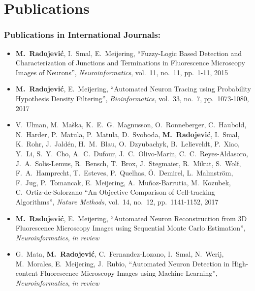 %
%

\noquote
\orgchpos
\chapter*{Publications}
\label{publications}

\small
\normalsize

\subsection*{Publications in International Journals:}
\vspace{1ex}
\begin{itemize}
	\item \textbf{M.~Radojevi\'{c}}, I.~Smal, E.~Meijering, ``Fuzzy-Logic Based Detection and Characterization of Junctions and Terminations in Fluorescence Microscopy Images of Neurons'', \emph{Neuroinformatics}, vol.~11, no.~11, pp.~1-11, 2015
	
	\item \textbf{M.~Radojevi\'{c}}, E.~Meijering, ``Automated Neuron Tracing using Probability Hypothesis Density Filtering'', \emph{Bioinformatics}, vol.~33, no.~7, pp.~1073-1080, 2017
	
	\item V.~Ulman, M.~Ma\v{s}ka, K.~E.~G.~Magnusson, O.~Ronneberger, C.~Haubold, N.~Harder, P.~Matula, P.~Matula, D.~Svoboda, \textbf{M.~Radojevi\'{c}}, I.~Smal, K.~Rohr, J.~Jald\'{e}n, H.~M.~Blau, O.~Dzyubachyk, B.~Lelieveldt, P.~Xiao, Y.~Li, S.~Y.~Cho, A.~C.~Dufour,	J.~C.~Olivo-Marin, C.~C.~Reyes-Aldasoro, J.~A.~Solis-Lemus, R.~Bensch, T.~Brox, J.~Stegmaier, R.~Mikut, S.~Wolf,	F.~A.~Hamprecht, T.~Esteves, P.~Quelhas, \"{O}.~Demirel, L.~Malmstr\"{o}m, F.~Jug, P.~Tomancak, E.~Meijering, A.~Mu\~{n}oz-Barrutia, M.~Kozubek, C.~Ortiz-de-Solorzano ``An Objective Comparison of Cell-tracking Algorithms'', \emph{Nature Methods}, vol.~14, no.~12, pp.~1141-1152, 2017
	
	\item \textbf{M.~Radojevi\'{c}}, E.~Meijering, ``Automated Neuron Reconstruction from 3D Fluorescence Microscopy Images using Sequential Monte Carlo Estimation'', \emph{Neuroinformatics}, \emph{in review}%
	
	\item G.~Mata, \textbf{M.~Radojevi\'{c}}, C.~Fernandez-Lozano, I.~Smal, N.~Werij, M.~Morales, E.~Meijering, J.~Rubio, ``Automated Neuron Detection in High-content Fluorescence Microscopy Images using Machine Learning'', \emph{Neuroinformatics}, \emph{in review}%
\end{itemize}

